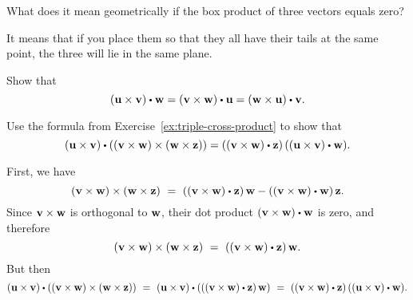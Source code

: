 \begin{ex} \label{exer-box-product-zero}
  What does it mean geometrically if the box product of three vectors
  equals zero?
  \begin{sol}
    It means that if you place them so that they all have their tails
    at the same point, the three will lie in the same plane.
  \end{sol}
\end{ex}

\begin{ex}
  Show that
  \begin{equation*}
    (\vect{u}\times \vect{v}) \dotprod \vect{w}=
    (\vect{v}\times \vect{w}) \dotprod \vect{u}=
    (\vect{w}\times \vect{u}) \dotprod \vect{v}.
  \end{equation*}
\end{ex}

\begin{ex}
  Use the formula from Exercise~\ref{ex:triple-cross-product} to show
  that
  \begin{equation*}
    (\vect{u}\times\vect{v}) \dotprod ((\vect{v}\times\vect{w}) \times
    (\vect{w}\times\vect{z})) =
    ((\vect{v}\times\vect{w})\dotprod\vect{z})\,((\vect{u}\times\vect{v})\dotprod\vect{w}).
  \end{equation*}
  \vspace{-4ex}
  \begin{sol}
    First, we have
    \begin{equation*}
      (\vect{v}\times\vect{w})\times(\vect{w}\times\vect{z})
      ~=~ ((\vect{v}\times\vect{w})\dotprod\vect{z})\,\vect{w}
          - ((\vect{v}\times\vect{w})\dotprod\vect{w})\,\vect{z}.
    \end{equation*}
    Since $\vect{v}\times\vect{w}$ is orthogonal to $\vect{w}$, their
    dot product $(\vect{v}\times\vect{w})\dotprod\vect{w}$ is zero,
    and therefore
    \begin{equation*}
      (\vect{v}\times\vect{w})\times(\vect{w}\times\vect{z})
      ~=~ ((\vect{v}\times\vect{w})\dotprod\vect{z})\,\vect{w}.
    \end{equation*}
    But then
    \begin{equation*}
      (\vect{u}\times\vect{v})\dotprod
      ((\vect{v}\times\vect{w})\times(\vect{w}\times\vect{z}))
      ~=~
      (\vect{u}\times\vect{v})\dotprod(((\vect{v}\times\vect{w})\dotprod\vect{z})\,\vect{w})
      ~=~ ((\vect{v}\times\vect{w})\dotprod\vect{z})\,((\vect{u}\times\vect{v})\dotprod\vect{w}).
    \end{equation*}

  \end{sol}
\end{ex}

